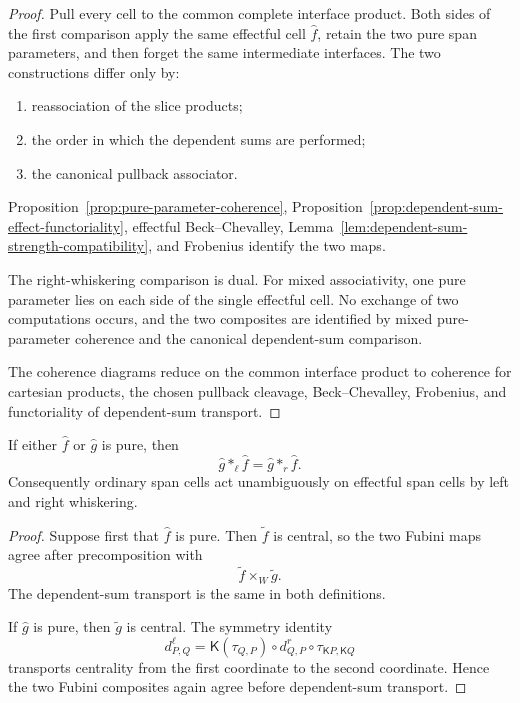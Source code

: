 \begin{proof}
Pull every cell to the common complete interface product.  Both sides of the
first comparison apply the same effectful cell \(\widehat f\), retain the two
pure span parameters, and then forget the same intermediate interfaces.
The two constructions differ only by:
\begin{enumerate}
    \item reassociation of the slice products;
    \item the order in which the dependent sums are performed;
    \item the canonical pullback associator.
\end{enumerate}
Proposition~\ref{prop:pure-parameter-coherence},
Proposition~\ref{prop:dependent-sum-effect-functoriality},
effectful Beck--Chevalley,
Lemma~\ref{lem:dependent-sum-strength-compatibility}, and Frobenius identify
the two maps.

The right-whiskering comparison is dual.  For mixed associativity, one pure
parameter lies on each side of the single effectful cell.  No exchange of two
computations occurs, and the two composites are identified by mixed
pure-parameter coherence and the canonical dependent-sum comparison.

The coherence diagrams reduce on the common interface product to coherence
for cartesian products, the chosen pullback cleavage, Beck--Chevalley,
Frobenius, and functoriality of dependent-sum transport.
\end{proof}

\begin{corollary}
\label{prop:pure-whiskering-effectful-spans}
If either \(\widehat f\) or \(\widehat g\) is pure, then
\[
    \widehat g\ast_\ell\widehat f
    =
    \widehat g\ast_r\widehat f.
\]
Consequently ordinary span cells act unambiguously on effectful span cells by
left and right whiskering.
\end{corollary}

\begin{proof}
Suppose first that \(\widehat f\) is pure.  Then \(\widetilde f\) is central,
so the two Fubini maps agree after precomposition with
\[
    \widetilde f\times_W\widetilde g.
\]
The dependent-sum transport is the same in both definitions.

If \(\widehat g\) is pure, then \(\widetilde g\) is central.  The symmetry
identity
\[
    d^{\ell}_{P,Q}
    =
    \mathsf K(\tau_{Q,P})
    \circ
    d^{r}_{Q,P}
    \circ
    \tau_{\mathsf KP,\mathsf KQ}
\]
transports centrality from the first coordinate to the second coordinate.
Hence the two Fubini composites again agree before dependent-sum transport.
\end{proof}

